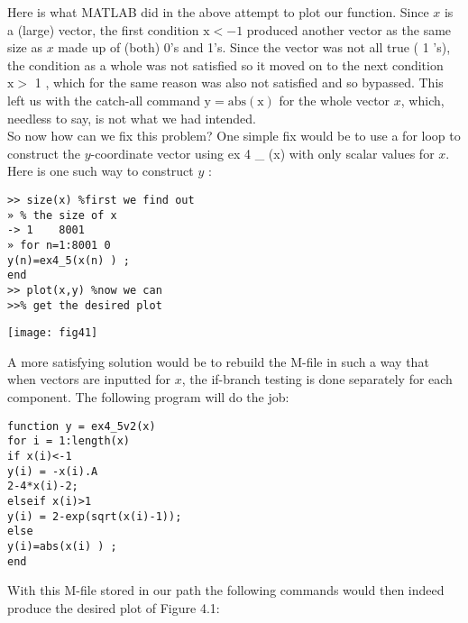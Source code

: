 \documentclass[../main.tex]{subfiles}
\begin{document}
Here is what MATLAB did in the above attempt to plot our function. Since $x$ is a (large) vector, the first condition $\mathrm{x}<-1$ produced another vector as the same size as $x$ made up of (both) 0's and 1's. Since the vector was not all true ( 1 's), the condition as a whole was not satisfied so it moved on to the next condition $\mathrm{x}>$ 1 , which for the same reason was also not satisfied and so bypassed. This left us with the catch-all command $\mathrm{y}=\mathrm{abs}(\mathrm{x})$ for the whole vector $x$, which, needless to say, is not what we had intended.\\

So now how can we fix this problem? One simple fix would be to use a for loop to construct the $y$-coordinate vector using ex 4 \_ (x) with only scalar values for $x$.\\

Here is one such way to construct $y$ :\\

\begin{minipage}[t]{.6\linewidth}
\begin{verbatim}
>> size(x) %first we find out
» % the size of x
-> 1 	8001
» for n=1:8001 0
y(n)=ex4_5(x(n) ) ;
end
>> plot(x,y) %now we can
>>% get the desired plot 
\end{verbatim}

\end{minipage}
\hspace{0.02\linewidth}
\begin{minipage}[t]{.5\linewidth}
  \strut\vspace*{-\baselineskip}\newline\texttt{[image: fig41]}
\label{fig:fig4_2}
\end{minipage}
 
  
A more satisfying solution would be to rebuild the M-file in such a way that when vectors are inputted for $x$, the if-branch testing is done separately for each component. The following program will do the job:

\begin{verbatim}
function y = ex4_5v2(x)
for i = 1:length(x)
if x(i)<-1
y(i) = -x(i).A
2-4*x(i)-2;
elseif x(i)>1
y(i) = 2-exp(sqrt(x(i)-1));
else
y(i)=abs(x(i) ) ;
end 
\end{verbatim}


With this M-file stored in our path the following commands would then indeed produce the desired plot of Figure 4.1:
\end{document}
